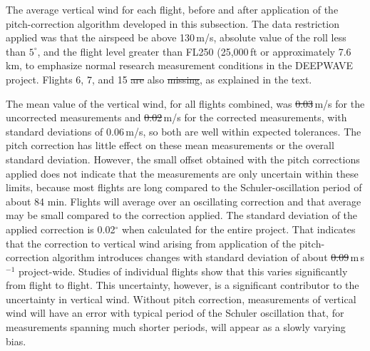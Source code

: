 \documentclass[12pt,twoside,english]{article}\usepackage[]{graphicx}\usepackage[]{color}
\let\OrgIndex\index
\renewcommand*{\index}[1]{\OrgIndex{#1}}
\providecommand{\DIFadd}[1]{{\protect\color{blue}\uwave{#1}}} %
\providecommand{\DIFdel}[1]{{\protect\color{red}\sout{#1}}}                      %
\providecommand{\DIFaddbegin}{} %
\providecommand{\DIFaddend}{} %
\providecommand{\DIFdelbegin}{} %
\providecommand{\DIFdelend}{} %
\providecommand{\DIFaddFL}[1]{\DIFadd{#1}} %
\providecommand{\DIFdelFL}[1]{\DIFdel{#1}} %
\providecommand{\DIFaddbeginFL}{} %
\providecommand{\DIFaddendFL}{} %
\providecommand{\DIFdelbeginFL}{} %
\providecommand{\DIFdelendFL}{} %
\begin{document}
{{\begin{center}
\begin{table}[H]
\protect\caption[The average vertical wind for each flight, before and after application of the pitch-correction algorithm.]{The average vertical wind for each flight, before and after application of the pitch-correction algorithm developed in this subsection. The data restriction applied was that the airspeed be above 130\,m/s, absolute value of the roll less than $5^{\circ}$, and the flight level greater than FL250 (25,000\,ft or approximately 7.6\,km, to emphasize normal research measurement conditions in the DEEPWAVE project. Flights 6, 7, and 15 \DIFdelbeginFL \DIFdelFL{are }\DIFdelendFL \DIFaddbeginFL \DIFaddFL{were }\DIFaddendFL also \DIFdelbeginFL \DIFdelFL{missing}\DIFdelendFL \DIFaddbeginFL \DIFaddFL{excluded}\DIFaddendFL , as explained in the text.\label{tab:vw-by-flight}} 
\end{table}

\par\end{center}


The mean value of the vertical wind, for all flights combined, was 
\DIFdelbegin \DIFdel{0.03}\DIFdelend \DIFaddbegin \DIFadd{0.02}\DIFaddend \,m/s for the uncorrected measurements and \DIFdelbegin \DIFdel{0.02}\DIFdelend \DIFaddbegin \DIFadd{0.01}\DIFaddend \,m/s for the corrected measurements, with standard deviations of  
0.06\,m/s,  so both are well within expected tolerances. The pitch correction has little effect on these mean measurements or the overall standard deviation.  However, the small offset obtained with the pitch corrections applied does not indicate that the measurements are only uncertain within these limits, because most flights are long compared to the Schuler-oscillation period of about 84 min. Flights will average over an oscillating correction and that average may be small compared to the correction applied. The standard deviation of the applied correction is 0.02$^{\circ}$ when calculated for the entire project. That indicates that the correction to vertical wind arising from application of the pitch-correction algorithm introduces changes with standard deviation of about 
\DIFdelbegin \DIFdel{0.09}\DIFdelend \DIFaddbegin \DIFadd{0.08}\DIFaddend \,m\,s$^{-1}$  project-wide. Studies of individual flights  show that this varies significantly from flight to flight. This uncertainty, however, is a significant contributor to the uncertainty in vertical wind.  Without pitch correction, measurements of vertical wind  will have an error with typical period of the Schuler oscillation that, for measurements spanning much shorter periods, will appear as a slowly varying bias.

}}
\end{document}
